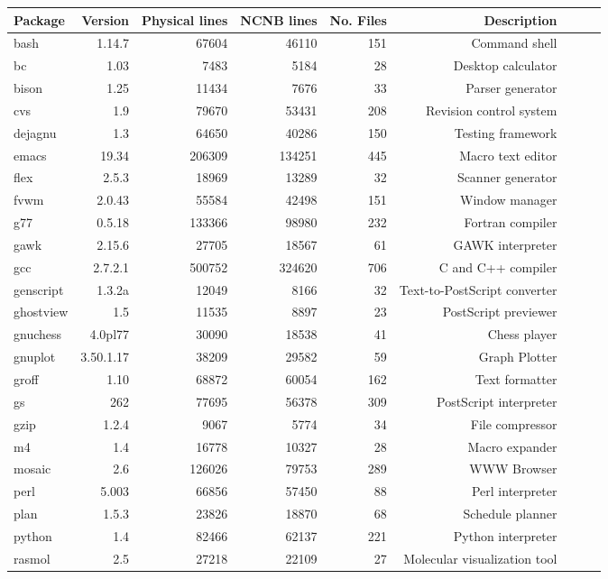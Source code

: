 \begin{tabular}{|l|r|r|r|r|r|r|r|l|}\hline
Package & Version & Physical lines & NCNB lines & No. Files & Description\\\hline\hline
bash & 1.14.7 & 67604 & 46110 & 151 & Command shell \\\hline
bc & 1.03 & 7483 & 5184 & 28 & Desktop calculator \\\hline
bison & 1.25 & 11434 & 7676 & 33 & Parser generator \\\hline
cvs & 1.9 & 79670 & 53431 & 208 & Revision control system \\\hline
dejagnu & 1.3 & 64650 & 40286 & 150 & Testing framework \\\hline
emacs & 19.34 & 206309 & 134251 & 445 & Macro text editor\\\hline
flex & 2.5.3 & 18969 & 13289 & 32 & Scanner generator \\\hline
fvwm & 2.0.43 & 55584 & 42498 & 151 & Window manager \\\hline
g77 & 0.5.18 & 133366 & 98980 & 232 & Fortran compiler \\\hline
gawk & 2.15.6 & 27705 & 18567 & 61 & GAWK interpreter \\\hline
gcc & 2.7.2.1 & 500752 & 324620 & 706 & C and C++ compiler\\\hline
genscript & 1.3.2a & 12049 & 8166 & 32 & Text-to-PostScript converter \\\hline
ghostview & 1.5 & 11535 & 8897 & 23 & PostScript previewer \\\hline
gnuchess & 4.0pl77 & 30090 & 18538 & 41 & Chess player \\\hline
gnuplot & 3.50.1.17 & 38209 & 29582 & 59 & Graph Plotter \\\hline
groff & 1.10 & 68872 & 60054 & 162 & Text formatter \\\hline
gs & 262 & 77695 & 56378 & 309 & PostScript interpreter \\\hline
gzip & 1.2.4 & 9067 & 5774 & 34 & File compressor \\\hline
m4 & 1.4 & 16778 & 10327 & 28 & Macro expander \\\hline
mosaic & 2.6 & 126026 & 79753 & 289 & WWW Browser\\\hline
perl & 5.003 & 66856 & 57450 & 88 & Perl interpreter \\\hline
plan & 1.5.3 & 23826 & 18870 & 68 & Schedule planner \\\hline
python & 1.4 & 82466 & 62137 & 221 & Python interpreter \\\hline
rasmol & 2.5 & 27218 & 22109 & 27 & Molecular visualization tool\\\hline

\end{tabular}
